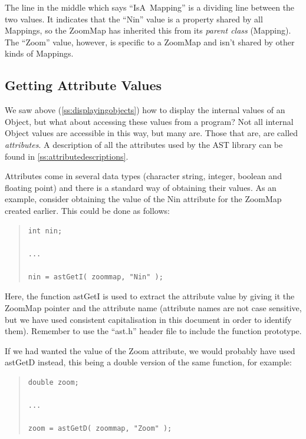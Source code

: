 \documentclass[twoside,11pt]{article}
\newcommand{\htmlref}[2]{#1}
\newcommand{\appref}[1]{Appendix~\ref{#1}}
\newcommand{\secref}[1]{\S\ref{#1}}
\renewcommand{\appref}[1]{\ref{#1}}
\renewcommand{\secref}[1]{\ref{#1}}
\begin{document}
The line in the middle which says ``IsA~\htmlref{Mapping}{Mapping}'' is a dividing line
between the two values. It indicates that the ``\htmlref{Nin}{Nin}'' value is a
property shared by all Mappings, so the ZoomMap has inherited this
from its {\em{parent class}} (Mapping). The ``\htmlref{Zoom}{Zoom}'' value, however,
is specific to a ZoomMap and isn't shared by other kinds of Mappings.

\subsection{\label{ss:gettingattributes}Getting Attribute Values}

We saw above (\secref{ss:displayingobjects}) how to display the
internal values of an \htmlref{Object}{Object}, but what about accessing these values
from a program?  Not all internal Object values are accessible in this
way, but many are. Those that are, are called {\em{attributes}}. A
description of all the attributes used by the AST library can be found
in \appref{ss:attributedescriptions}.

Attributes come in several data types (character string, integer,
boolean and floating point) and there is a standard way of obtaining
their values. As an example, consider obtaining the value of the \htmlref{Nin}{Nin}
attribute for the \htmlref{ZoomMap}{ZoomMap} created earlier. This could be done as
follows:

\begin{quote}
\small
\begin{verbatim}
int nin;

...

nin = astGetI( zoommap, "Nin" );
\end{verbatim}
\normalsize
\end{quote}

Here, the function astGetI is used to extract the attribute value by
giving it the ZoomMap pointer and the attribute name (attribute names
are not case sensitive, but we have used consistent capitalisation in
this document in order to identify them). Remember to use the
``ast.h'' header file to include the function prototype.

If we had wanted the value of the \htmlref{Zoom}{Zoom} attribute, we would probably
have used astGetD instead, this being a double version of the same
function, for example:

\begin{quote}
\small
\begin{verbatim}
double zoom;

...

zoom = astGetD( zoommap, "Zoom" );
\end{verbatim}
\normalsize
\end{quote}
\end{document}
